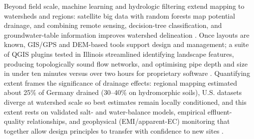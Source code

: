 Beyond field scale, machine learning and hydrologic filtering extend mapping to
watersheds and regions: satellite big data with random forests map potential
drainage, and combining remote sensing, decision-tree classification, and
groundwater-table information improves watershed delineation
\parencite{Cho2019,Yimer2023}. Once layouts are known, GIS/GPS and
DEM-based tools support design and management; a suite of QGIS plugins tested in
Illinois streamlined identifying landscape features, producing topologically
sound flow networks, and optimising pipe depth and size in under ten minutes
versus over two hours for proprietary software
\parencite{Shedekar2018,Falasy2025,Falasy2024,Falasy2025b}. Quantifying extent
frames the significance of drainage effects: regional mapping estimated about
25\% of Germany drained (30--40\% on hydromorphic soils), U.S. datasets diverge
at watershed scale so best estimates remain locally conditioned, and this
extent rests on validated salt- and water-balance models, empirical
effluent-quality relationships, and geophysical (EMI/apparent-EC) monitoring
that together allow design principles to transfer with confidence to new sites
\parencite{Hirt2005,Hirt2011,Jame2022,Chen2025,Tian2023,Bahçeci2006,Skaggs2006,Narjary2024,Qin2025}.